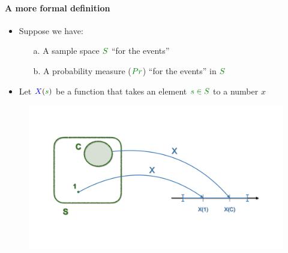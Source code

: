 \documentclass[smaller, handout]{beamer}\usepackage[]{graphicx}\usepackage[]{color}
\begin{document}
\begin{frame}{\secname}
\framesubtitle{A more formal definition}
  \begin{itemize}
  \item Suppose we have:

  \begin{enumerate}[a.]
  \item[a.] A sample space $\color{Mygreen} S \color{black}$ ``for the events''
  \item[b.] A probability measure ($\color{Mygreen} Pr \color{black}$) ``for the events'' in $\color{Mygreen} S \color{black}$
  \end{enumerate}
  \pause
  \item Let $\color{blue} X \color{black}(\color{Mygreen} s \color{black})$ be a function that takes an element $\color{Mygreen}  s\in S\color{black}$ to a number $x$

  \end{itemize}
  \pause
  \begin{minipage}{1.0\textwidth}
  \begin{figure}[h!]
  \centering
  \includegraphics[scale=0.15]{img/charts.010.png}
  \end{figure}
  \end{minipage}
\end{frame}
\end{document}
